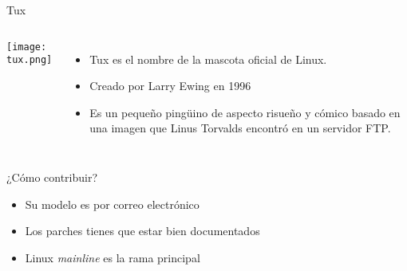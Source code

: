 \begin{frame}[c]{Tux}
  \begin{columns}
      \begin{center}
        \texttt{[image: tux.png]}
      \end{center}
      \begin{itemize}
        \item Tux es el nombre de la mascota oficial de Linux.
        \pause
        \item Creado por Larry Ewing en 1996
        \pause
        \item Es un pequeño pingüino de aspecto risueño y cómico basado
          en una imagen que Linus Torvalds encontró en un servidor FTP.
      \end{itemize}
  \end{columns}
\end{frame}

\begin{frame}[c]{¿Cómo contribuir?}
  \begin{itemize}
    \item Su modelo es por correo electrónico
    \pausa
    \item Los parches tienes que estar bien documentados
    \pausa
    \item Linux \emph{mainline} es la rama principal
  \end{itemize}
\end{frame}
